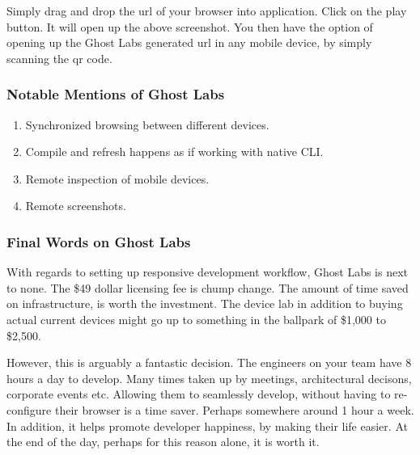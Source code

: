 Simply drag and drop the url of your browser into application. Click on the play
button. It will open up the above screenshot. You then have the option of
opening up the Ghost Labs generated url in any mobile device, by simply
scanning the qr code.

\subsubsection{ Notable Mentions of Ghost Labs }
\begin{enumerate}
  \item Synchronized browsing between different devices.
  \item Compile and refresh happens as if working with native CLI.
  \item Remote inspection of mobile devices.
  \item Remote screenshots.
\end{enumerate}

\subsubsection{ Final Words on Ghost Labs }
With regards to setting up responsive development workflow, Ghost Labs is next
to none. The \$49 dollar licensing fee is chump change. The amount of time
saved on infrastructure, is worth the investment. The device lab in addition
to buying actual current devices might go up to something in the ballpark of
\$1,000 to \$2,500.

However, this is arguably a fantastic decision. The engineers on your team have
8 hours a day to develop. Many times taken up by meetings, architectural
decisons, corporate events etc. Allowing them to seamlessly develop, without
having to re-configure their browser is a time saver. Perhaps somewhere around
1 hour a week. In addition, it helps promote developer happiness, by making
their life easier. At the end of the day, perhaps for this reason alone, it is
worth it.
